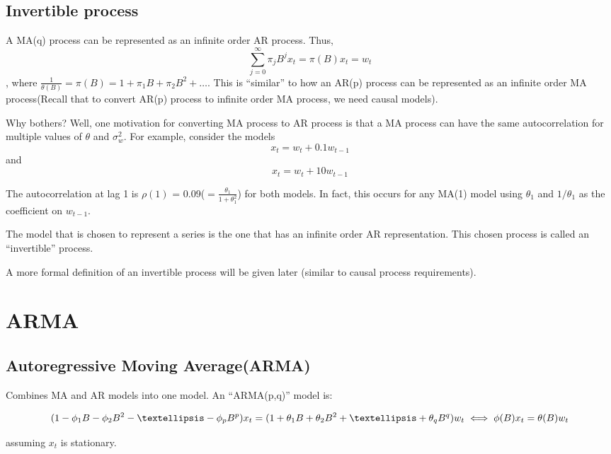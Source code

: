 \documentclass[
]{book}
\theoremstyle{definition}
\theoremstyle{definition}
\theoremstyle{definition}
\theoremstyle{definition}
\theoremstyle{remark}
\begin{document}
\hypertarget{invertible-process}{%
\section{Invertible process}\label{invertible-process}}

A MA(q) process can be represented as an infinite order AR process. Thus,\\
\[\sum_{j=0}^{\infty}\pi_jB^jx_t=\pi(B)x_t=w_t\], where \(\frac{1}{\theta(B)}=\pi(B) = 1+\pi_1B+\pi_2B^2+ …\). This is ``similar'' to how an AR(p) process can be represented as an infinite order MA process(Recall that to convert AR(p) process to infinite order MA process, we need causal models).

Why bothers? Well, one motivation for converting MA process to AR process is that a MA process can have the same autocorrelation for multiple values of \(\theta\) and \(\sigma_w^2\). For example, consider the models \[x_t=w_t+0.1w_{t-1}\] and \[x_t=w_t+10w_{t-1}\]

The autocorrelation at lag 1 is \(\rho(1)\) = 0.09(\(=\frac{\theta_1}{1+\theta_1^2}\)) for both models. In fact, this occurs for any MA(1) model using \(\theta_1\) and \(1/\theta_1\) as the coefficient on \(w_{t-1}\).

The model that is chosen to represent a series is the one that has an infinite order AR representation. This chosen process is called an ``invertible'' process.

A more formal definition of an invertible process will be given later (similar to causal process requirements).

\hypertarget{arma}{%
\chapter{ARMA}\label{arma}}

\hypertarget{autoregressive-moving-averagearma}{%
\section{Autoregressive Moving Average(ARMA)}\label{autoregressive-moving-averagearma}}

Combines MA and AR models into one model. An ``ARMA(p,q)'' model is:

\[(1-\phi_1B-\phi_2B^2-…-\phi_pB^p)x_t = (1+\theta_1B+\theta_2B^2+…+\theta_qB^q)w_t\\
\iff \phi(B)x_t = \theta(B)w_t\]

assuming \(x_t\) is stationary.
\end{document}
